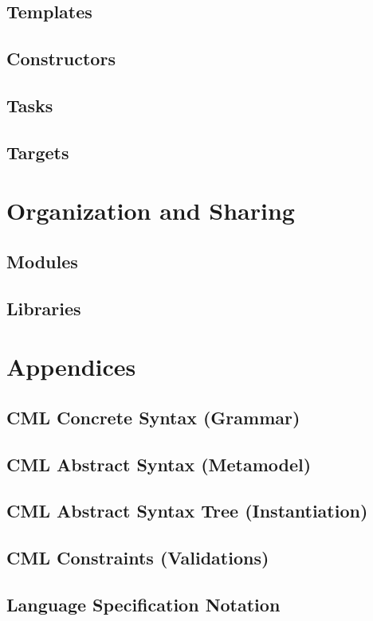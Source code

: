 \documentclass[a4paper,oneside,12pt, extrafontsizes]{memoir}
\begin{document}
  \chapter{Templates}
  \label{sec:templates}

  \chapter{Constructors}
  \label{sec:constructors}

  \chapter{Tasks}
  \label{sec:tasks}

  \chapter{Targets}
  \label{sec:targets}

\part{Organization and Sharing}

  \chapter{Modules}
  \label{ch:modules}

  \chapter{Libraries}
  \label{ch:libraries}

\part{Appendices}

\appendix

  \chapter{CML Concrete Syntax (Grammar)}
  \label{apx:concrete-syntax}
  

  \chapter{CML Abstract Syntax (Metamodel)}
  \label{apx:abstract-syntax}
  

  \chapter{CML Abstract Syntax Tree (Instantiation)}
  \label{apx:ast}
  

  \chapter{CML Constraints (Validations)}
  \label{apx:ocl}
  

  \chapter{Language Specification Notation}
  \label{apx:lsl}
  

\backmatter



\end{document}
